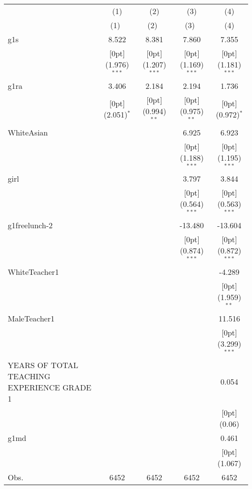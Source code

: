 \begin{tabular*}{\textwidth}{@{\extracolsep{\fill}}lcccc}				
	& \multicolumn{1}{c}{(1)} &	\multicolumn{1}{c}{(2)} &	\multicolumn{1}{c}{(3)} &	\multicolumn{1}{c}{(4)} \\
\cline{2-5}				
	& \multicolumn{1}{c}{(1)\mbox{\ }} &	\multicolumn{1}{c}{(2)\mbox{\ }} &	\multicolumn{1}{c}{(3)\mbox{\ }} &	\multicolumn{1}{c}{(4)} \\
\hline				
g1s &	8.522 &	8.381 &	7.860 &	7.355 \\
&	\raisebox{.7ex}[0pt]{\scriptsize (1.976)$^{***}$} &	\raisebox{.7ex}[0pt]{\scriptsize (1.207)$^{***}$} &	\raisebox{.7ex}[0pt]{\scriptsize (1.169)$^{***}$} &	\raisebox{.7ex}[0pt]{\scriptsize (1.181)$^{***}$} \\
g1ra &	3.406 &	2.184 &	2.194 &	1.736 \\
&	\raisebox{.7ex}[0pt]{\scriptsize (2.051)$^{*}$} &	\raisebox{.7ex}[0pt]{\scriptsize (0.994)$^{**}$} &	\raisebox{.7ex}[0pt]{\scriptsize (0.975)$^{**}$} &	\raisebox{.7ex}[0pt]{\scriptsize (0.972)$^{*}$} \\
WhiteAsian &	&	&	6.925 &	6.923 \\
&	&	&	\raisebox{.7ex}[0pt]{\scriptsize (1.188)$^{***}$} &	\raisebox{.7ex}[0pt]{\scriptsize (1.195)$^{***}$} \\
girl &	&	&	3.797 &	3.844 \\
&	&	&	\raisebox{.7ex}[0pt]{\scriptsize (0.564)$^{***}$} &	\raisebox{.7ex}[0pt]{\scriptsize (0.563)$^{***}$} \\
g1freelunch-2 &	&	&	-13.480 &	-13.604 \\
&	&	&	\raisebox{.7ex}[0pt]{\scriptsize (0.874)$^{***}$} &	\raisebox{.7ex}[0pt]{\scriptsize (0.872)$^{***}$} \\
WhiteTeacher1 &	&	&	&	-4.289 \\
&	&	&	&	\raisebox{.7ex}[0pt]{\scriptsize (1.959)$^{**}$} \\
MaleTeacher1 &	&	&	&	11.516 \\
&	&	&	&	\raisebox{.7ex}[0pt]{\scriptsize (3.299)$^{***}$} \\
YEARS OF TOTAL TEACHING EXPERIENCE GRADE 1 &	&	&	&	0.054 \\
&	&	&	&	\raisebox{.7ex}[0pt]{\scriptsize (0.06)} \\
g1md &	&	&	&	0.461 \\
&	&	&	&	\raisebox{.7ex}[0pt]{\scriptsize (1.067)} \\
Obs. &	6452 &	6452 &	6452 &	6452 \\
\hline\hline				
\end{tabular*}%
